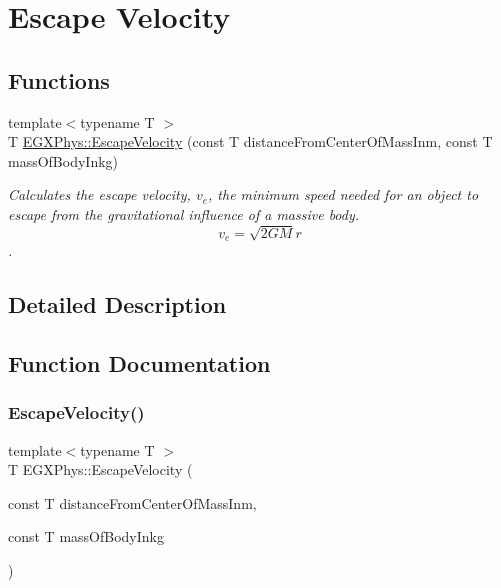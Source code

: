 \hypertarget{group___e_g_x_phys-_astrophysics-_escape_velocity}{}\section{Escape Velocity}
\label{group___e_g_x_phys-_astrophysics-_escape_velocity}
\subsection*{Functions}
\begin{DoxyCompactItemize}
\item 
{\footnotesize template$<$typename T $>$ }\\T \mbox{\hyperlink{group___e_g_x_phys-_astrophysics-_escape_velocity_gaeb8c0c9e780f883ea33498f076b08cb9}{E\+G\+X\+Phys\+::\+Escape\+Velocity}} (const T distance\+From\+Center\+Of\+Mass\+Inm, const T mass\+Of\+Body\+Inkg)
\begin{DoxyCompactList}\small\item\em Calculates the escape velocity, $v_{e}$, the minimum speed needed for an object to escape from the gravitational influence of a massive body. \[v_{e}=\sqrt{2 G M}{r}\]. \end{DoxyCompactList}\end{DoxyCompactItemize}


\subsection{Detailed Description}


\subsection{Function Documentation}
\mbox{\label{group___e_g_x_phys-_astrophysics-_escape_velocity_gaeb8c0c9e780f883ea33498f076b08cb9}} 
\subsubsection{\texorpdfstring{Escape\+Velocity()}{EscapeVelocity()}}
{\footnotesize\ttfamily template$<$typename T $>$ \\
T E\+G\+X\+Phys\+::\+Escape\+Velocity (\begin{DoxyParamCaption}\item[{const T}]{distance\+From\+Center\+Of\+Mass\+Inm,  }\item[{const T}]{mass\+Of\+Body\+Inkg }\end{DoxyParamCaption})}



